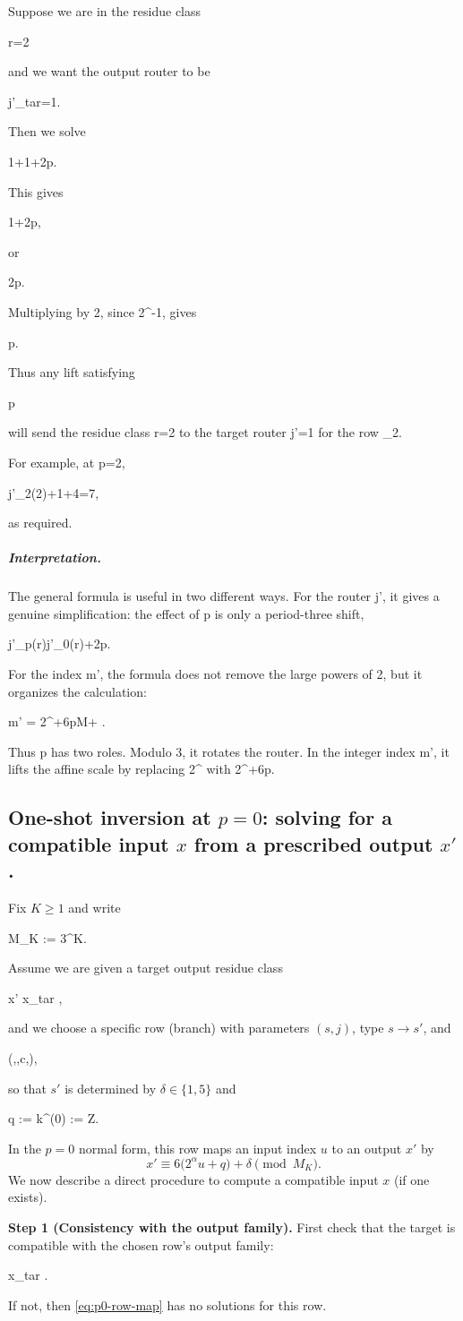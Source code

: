 \documentclass[11pt,letterpaper]{amsart}
\def\mathrm#1{#1}%
\def\mathbb#1{#1}%
\def\({}%
\def\){}%
\def\[{ }%
\def\]{ }%
\theoremstyle{definition}
\theoremstyle{plain}
\theoremstyle{plain}
\theoremstyle{remark}
\begin{document}
Suppose we are in the residue class
\[
r=2
\]
and we want the output router to be
\[
j'_{\mathrm{tar}}=1.
\]
Then we solve
\[
1+1+2p.
\]
This gives
\[
1+2p,
\]
or
\[
2p.
\]
Multiplying by \(2\), since \(2^{-1}\), gives
\[
p.
\]
Thus any lift satisfying
\[
p
\]
will send the residue class \(r=2\) to the target router \(j'=1\) for
the row \(\Psi_2\).

For example, at \(p=2\),
\[
j'_2(2)+1+4=7,
\]
as required.

\subparagraph{Interpretation.}

The general formula is useful in two different ways.  For the router
\(j'\), it gives a genuine simplification: the effect of \(p\) is only a
period-three shift,
\[
j'_p(r)\equiv j'_0(r)+2p.
\]
For the index \(m'\), the formula does not remove the large powers of
\(2\), but it organizes the calculation:
\[
m'
=
2^{\alpha+6p}M+
\left\lfloor
{}
\right\rfloor.
\]
Thus \(p\) has two roles.  Modulo \(3\), it rotates the router.  In the
integer index \(m'\), it lifts the affine scale by replacing \(2^\alpha\)
with \(2^{\alpha+6p}\).

\subsection{One-shot inversion at $p=0$: solving for a compatible input $x$ from a prescribed output $x'$.}
Fix $K\ge 1$ and write
\[
M_K := 3^K.
\]
Assume we are given a target output residue class
\[
x' \equiv x_{\mathrm{tar}} ,
\]
and we choose a specific row (branch) with parameters $(s,j)$, type $s\to s'$, and
\[
(\alpha,\beta,c,\delta)\qquad{},
\]
so that $s'$ is determined by $\delta\in\{1,5\}$ and
\[
q := k^{(0)} := \in\mathbb Z.
\]
In the $p=0$ normal form, this row maps an input index $u$ to an output $x'$ by
\begin{equation}\label{eq:p0-row-map}
x' \equiv 6\bigl(2^\alpha u + q\bigr)+\delta \pmod{M_K}.
\end{equation}
We now describe a direct procedure to compute a compatible input $x$ (if one exists).

\smallskip
\noindent\textbf{Step 1 (Consistency with the output family).}
First check that the target is compatible with the chosen row's output family:
\[
x_{\mathrm{tar}} \equiv \delta {}.
\]
If not, then \eqref{eq:p0-row-map} has no solutions for this row.
\end{document}
